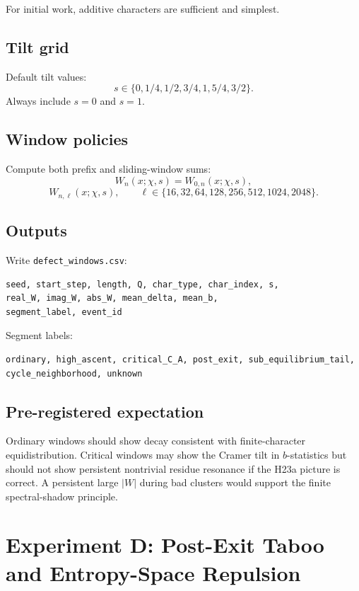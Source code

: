 \documentclass[11pt]{article}
\begin{document}
For initial work, additive characters are sufficient and simplest.

\subsection{Tilt grid}

Default tilt values:
\[
        s\in\{0,1/4,1/2,3/4,1,5/4,3/2\}.
\]
Always include \(s=0\) and \(s=1\).

\subsection{Window policies}

Compute both prefix and sliding-window sums:
\[
        W_n(x;\chi,s)=W_{0,n}(x;\chi,s),
\]
\[
        W_{n,\ell}(x;\chi,s),
        \qquad \ell\in\{16,32,64,128,256,512,1024,2048\}.
\]

\subsection{Outputs}

Write \texttt{defect\_windows.csv}:
\begin{lstlisting}
seed, start_step, length, Q, char_type, char_index, s,
real_W, imag_W, abs_W, mean_delta, mean_b,
segment_label, event_id
\end{lstlisting}

Segment labels:
\begin{lstlisting}
ordinary, high_ascent, critical_C_A, post_exit, sub_equilibrium_tail,
cycle_neighborhood, unknown
\end{lstlisting}

\subsection{Pre-registered expectation}

Ordinary windows should show decay consistent with finite-character equidistribution.  Critical windows may show the Cramer tilt in \(b\)-statistics but should not show persistent nontrivial residue resonance if the H23a picture is correct.  A persistent large \(|W|\) during bad clusters would support the finite spectral-shadow principle.

\section{Experiment D: Post-Exit Taboo and Entropy-Space Repulsion}
\end{document}
